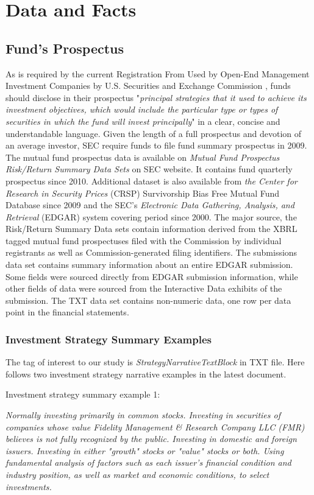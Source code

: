\documentclass[12pt]{article} %
\begin{document}
	
	
\section{Data and Facts}
	\subsection{Fund's Prospectus}
	As is required by the current Registration From Used by Open-End Management Investment Companies by U.S. Securities and Exchange Commission \cite{SEC1998}, funds should disclose in their prospectus "\textit{principal strategies that it used to achieve its investment objectives, which would include the particular type or types of securities in which the fund will invest principally}" in a clear, concise and understandable language. Given the length of a full prospectus and devotion of an average investor, SEC require funds to file fund summary prospectus in 2009. The mutual fund prospectus data is available on \textit{Mutual Fund Prospectus Risk/Return Summary Data Sets} on SEC website. It contains fund quarterly prospectus since 2010. Additional dataset is also available from \textit{the Center for Research in Security Prices} (CRSP) Survivorship Bias Free Mutual Fund Database since 2009 and the SEC's \textit{Electronic Data Gathering, Analysis, and Retrieval} (EDGAR) system covering period since 2000. The major source, the Risk/Return Summary Data sets contain information derived from the XBRL tagged mutual fund prospectuses filed with the Commission by individual registrants as well as Commission-generated filing identifiers. The submissions data set contains summary information about an entire EDGAR submission. Some fields were sourced directly from EDGAR submission information, while other fields of data were sourced from the Interactive Data exhibits of the submission. The TXT data set contains non-numeric data, one row per data point in the financial statements.\par

	\subsubsection{Investment Strategy Summary Examples}
	The tag of interest to our study is \textit{StrategyNarrativeTextBlock} in TXT file. Here follows two investment strategy narrative examples in the latest document.\par
	
	Investment strategy summary example 1:
	\begin{addmargin}[2cm]{2cm}
	\textit{Normally investing primarily in common stocks. Investing in securities of companies whose value Fidelity Management \& Research Company LLC (FMR) believes is not fully recognized by the public. Investing in domestic and foreign issuers. Investing in either "growth" stocks or "value" stocks or both. Using fundamental analysis of factors such as each issuer's financial condition and industry position, as well as market and economic conditions, to select investments.}
	\end{addmargin}
	
\end{document}
